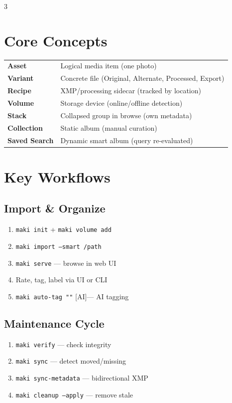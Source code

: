 \documentclass[a4paper,landscape,8pt]{article}
\newcommand{\cmd}[1]{\texttt{\footnotesize #1}}
\newcommand{\ai}{\textcolor{maki-teal}{\scriptsize [AI]}}
\begin{document}
\renewcommand{\arraystretch}{1.2}
\begin{multicols}{3}

\section{Core Concepts}
\begin{tabularx}{\columnwidth}{@{}lX@{}}
\textbf{Asset} & Logical media item (one photo) \\
\textbf{Variant} & Concrete file (Original, Alternate, Processed, Export) \\
\textbf{Recipe} & XMP/processing sidecar (tracked by location) \\
\textbf{Volume} & Storage device (online/offline detection) \\
\textbf{Stack} & Collapsed group in browse (own metadata) \\
\textbf{Collection} & Static album (manual curation) \\
\textbf{Saved Search} & Dynamic smart album (query re-evaluated) \\
\end{tabularx}

\section{Key Workflows}

\subsection{Import \& Organize}
\begin{enumerate}[leftmargin=1.5em]
\item \cmd{maki init} + \cmd{maki volume add}
\item \cmd{maki import --smart /path}
\item \cmd{maki serve} — browse in web UI
\item Rate, tag, label via UI or CLI
\item \cmd{maki auto-tag ""} \ai — AI tagging
\end{enumerate}

\subsection{Maintenance Cycle}
\begin{enumerate}[leftmargin=1.5em]
\item \cmd{maki verify} — check integrity
\item \cmd{maki sync} — detect moved/missing
\item \cmd{maki sync-metadata} — bidirectional XMP
\item \cmd{maki cleanup --apply} — remove stale
\end{enumerate}


\end{multicols}
\end{document}
